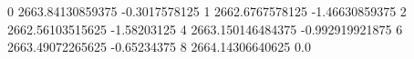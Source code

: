 0 2663.84130859375 -0.3017578125
1 2662.6767578125 -1.46630859375
2 2662.56103515625 -1.58203125
4 2663.150146484375 -0.992919921875
6 2663.49072265625 -0.65234375
8 2664.14306640625 0.0
